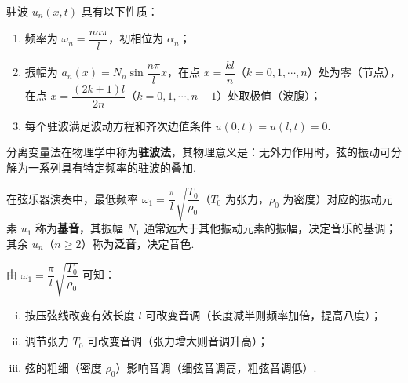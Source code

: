 \documentclass[../../main.tex]{subfiles}%
\begin{document}
\begin{proposition}
驻波 $u_n(x,t)$ 具有以下性质：
\begin{enumerate}[(1)]
\item 频率为 $\omega_n=\dfrac{na\pi}{l}$，初相位为 $\alpha_n$；
\item 振幅为 $a_n(x)=N_n\sin\dfrac{n\pi}{l}x$，在点 $x=\dfrac{kl}{n}$（$k=0,1,\cdots,n$）处为零（节点），在点 $x=\dfrac{(2k+1)l}{2n}$（$k=0,1,\cdots,n-1$）处取极值（波腹）；
\item 每个驻波满足波动方程和齐次边值条件 $u(0,t)=u(l,t)=0$.
\end{enumerate}
\end{proposition}
\begin{remark}
分离变量法在物理学中称为\textbf{驻波法}，其物理意义是：无外力作用时，弦的振动可分解为一系列具有特定频率的驻波的叠加.
\end{remark}
\begin{remark}
在弦乐器演奏中，最低频率 $\omega_1=\dfrac{\pi}{l}\sqrt{\dfrac{T_0}{\rho_0}}$（$T_0$ 为张力，$\rho_0$ 为密度）对应的振动元素 $u_1$ 称为\textbf{基音}，其振幅 $N_1$ 通常远大于其他振动元素的振幅，决定音乐的基调；其余 $u_n$（$n\geqslant 2$）称为\textbf{泛音}，决定音色.
\end{remark}
\begin{remark}
由 $\omega_1=\dfrac{\pi}{l}\sqrt{\dfrac{T_0}{\rho_0}}$ 可知：
\begin{enumerate}[(i)]
\item 按压弦线改变有效长度 $l$ 可改变音调（长度减半则频率加倍，提高八度）；
\item 调节张力 $T_0$ 可改变音调（张力增大则音调升高）；
\item 弦的粗细（密度 $\rho_0$）影响音调（细弦音调高，粗弦音调低）.
\end{enumerate}
\end{remark}
\end{document}
